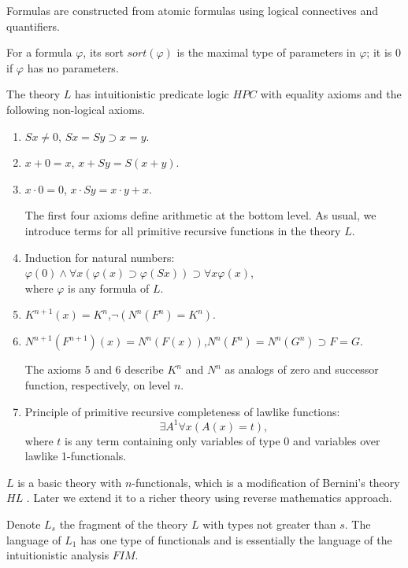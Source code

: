 \documentclass{asl}
\theoremstyle{definition}
\begin{document}
Formulas are constructed from atomic formulas using logical connectives and quantifiers.

For a formula $ \varphi $, its sort $sort(\varphi)$ is the maximal type of parameters in $ \varphi $; it is 0 if $ \varphi $ has no parameters. 

The theory $ L $ has intuitionistic predicate logic $HPC$ with equality axioms and the following non-logical axioms.

\begin{enumerate}
\item $ Sx \neq 0$, \qquad $Sx=Sy\supset x=y. $

\item $x+0=x$, \qquad $x+Sy=S(x+y)$.

\item $x\cdot 0=0$, \qquad $x\cdot Sy=x\cdot y+x$.

The first four axioms define arithmetic at the bottom level. As usual, we introduce terms for all primitive recursive functions in the theory $L$.

\item Induction for natural numbers: $ \varphi(0) \wedge \forall x \left(\varphi(x)\supset \varphi(Sx)\right) \supset \forall x \varphi(x)$, 
\\
where $\varphi$ is any formula of $L$.
\smallskip
\item $ K^{n+1}(x)=K^n$,\qquad $\neg \left( N^n\left( F^n\right)=K^n \right)$.
\smallskip
\item $ N^{n+1}\left(F^{n+1} \right)(x)=N^n\left( F(x)\right)$,\qquad $ N^{n}\left(F^{n} \right) = N^{n}\left(G^{n} \right) \supset F=G. $

The axioms 5 and 6 describe $ K^n $ and $ N^n $ as analogs of zero and successor function, respectively, on level $ n $.

\item Principle of primitive recursive completeness of lawlike functions:
\[ \exists A^1 \forall x \left(A(x)=t \right), \]
where $t$ is any term containing only variables of type 0 and variables over lawlike 1-functionals.
\end{enumerate}

$L$ is a basic theory with $n$-functionals, which is a modification of Bernini's theory $HL$ \cite{bern76}. Later we extend it to a richer theory using reverse mathematics approach.

Denote $L_s$ the fragment of the theory $L$ with types not greater than $ s $. The language of $L_1$ has one type of functionals and is essentially the language of the intuitionistic analysis $ FIM $.
\end{document}
